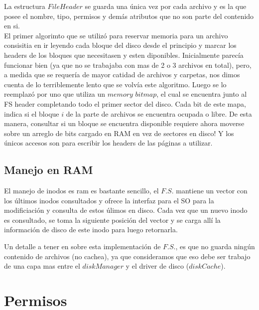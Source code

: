 \documentclass[english]{article}
\begin{document}
La estructura $File$$Header$ se guarda una única vez por cada archivo
y es la que posee el nombre, tipo, permisos y demás atributos que
no son parte del contenido en si.\\


El primer algorimto que se utilizó para reservar memoria para un archivo
consisitia en ir leyendo cada bloque del disco desde el principio
y marcar los headers de los bloques que necesitasen y esten diponibles. 
Inicialmente parecía funcionar bien (ya que no se trabajaba con mas de 2 o 3
 archivos en total), pero, a medida que se requería de mayor catidad de 
archivos y carpetas, nos dimos cuenta de lo terriblemente
lento que se volvía este algoritmo. Luego se lo reemplazó por uno
que utiliza un $memory$ $bitmap$, el cual se encuentra junto al
FS header completando todo el primer sector del disco. Cada bit de este
mapa, indica si el bloque $i$ de la parte de archivos se encuentra
ocupada o libre. De esta manera, consultar si un bloque se encuentra disponible 
requiere ahora moverse sobre un arreglo de bits cargado en RAM en vez de 
sectores en disco! Y los únicos accesos son para escribir los headers de las 
páginas a utilizar.


\subsection{Manejo en RAM}

El manejo de inodos es ram es bastante sencillo, el $F.S.$ mantiene
un vector con los últimos inodos consultados y ofrece la interfaz
para el SO para la modificiación y consulta de estos úlimos en disco.
Cada vez que un nuevo inodo es consultado, se toma la siguiente posición
del vector y se carga allí la información de disco de este inodo para
luego retornarla.

Un detalle a tener en sobre esta implementación de $F.S.$, es que
no guarda ningún contenido de archivos (no cachea), ya que consideramos
que eso debe ser trabajo de una capa mas entre el $diskManager$ y
el driver de disco ($diskCache$).

\pagebreak{}

\section{Permisos}
\end{document}
